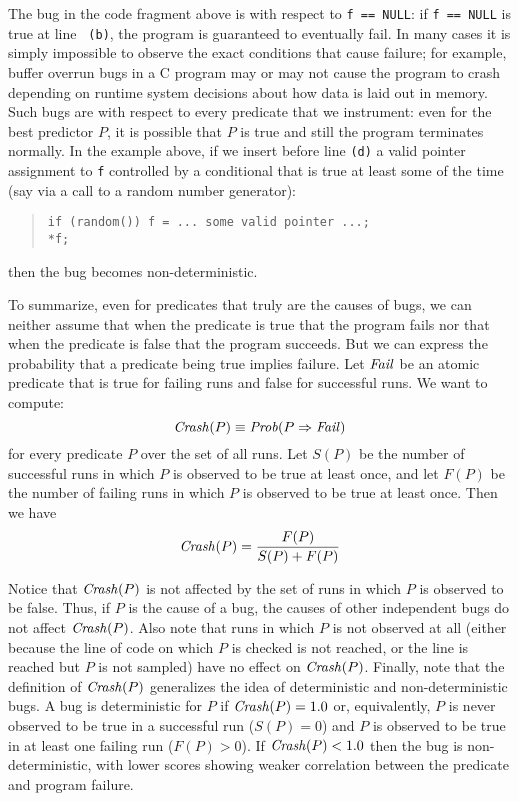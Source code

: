 The bug in the code fragment above is  with
respect to {\tt f == NULL}: if {\tt f == NULL} is true at line {\tt
(b)}, the program is guaranteed to eventually fail.  In many cases it
is simply impossible to observe the exact conditions that cause
failure; for example, buffer overrun bugs in a C program may or may
not cause the program to crash depending on runtime system decisions
about how data is laid out in memory.  Such bugs are
 with respect to every predicate that we instrument:
even for the best predictor $P$, it is possible that $P$ is true and
still the program terminates normally.  In the example above, if we insert before line
{\tt (d)} a valid pointer  assignment to {\tt f} controlled by a conditional that is true
at least some of the time (say via a call to a random number generator):
\begin{quote}
\begin{verbatim}
if (random()) f = ... some valid pointer ...;
*f;
\end{verbatim}
\end{quote}
then the bug becomes non-deterministic.

To summarize, even for predicates that truly are the causes of bugs, we can neither assume that
when the predicate is true that
the program fails nor that when the predicate is false that
the program succeeds. But we can express the probability that a predicate
being true implies failure.  Let $\mbox{\textit{Fail}}$ be an atomic predicate that is
true for failing runs and false for successful runs.  We want to compute:
\[ \mbox{\textit{Crash}}(P) \equiv \mbox{\textit{Prob}}(P \Rightarrow \mbox{\textit{Fail}}) \]
for every predicate $P$ over the set of all runs.  Let $S(P)$ be the number
of successful runs in which $P$ is observed to be true at least once, and let $F(P)$ be the number of
failing runs in which $P$ is observed to be true at least once.  Then we have
\[ \mbox{\textit{Crash}}(P) = \frac{F(P)}{S(P) + F(P)} \]

Notice that $\mbox{\textit{Crash}}(P)$ is not affected by the set of runs in which
$P$ is observed to be false.  Thus, if $P$ is the cause of a bug, the
causes of other independent bugs do not affect $\mbox{\textit{Crash}}(P)$.
Also note that runs in which $P$ is not observed at all (either because
the line of code on which $P$ is checked is not reached, or the line is reached
but $P$ is not sampled) have no effect on $\mbox{\textit{Crash}}(P)$.
Finally, note that the definition of $\mbox{\textit{Crash}}(P)$
generalizes the idea of deterministic and non-deterministic bugs.  A
bug is deterministic for $P$ if $\mbox{\textit{Crash}}(P) = 1.0$ or, equivalently,
$P$ is never observed to be true in a successful run ($S(P) =
0$) and $P$ is observed to be true in at least one failing run ($F(P) > 0$).
If $\mbox{\textit{Crash}}(P) < 1.0$ then the bug is non-deterministic, with
lower scores showing weaker correlation between the predicate and
program failure.

